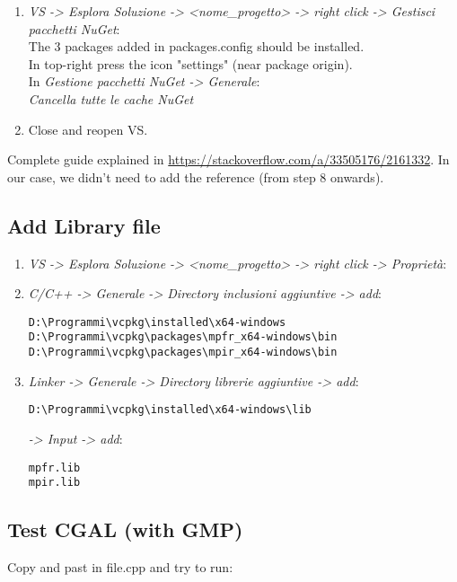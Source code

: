 \documentclass[10pt, english, openany]{report}
\begin{document}
\begin{appendices}
\begin{enumerate}
\item \textit{VS -> Esplora Soluzione -> <nome\_progetto> -> right click -> Gestisci pacchetti NuGet}: \\
The 3 packages added in packages.config should be installed.\\
In top-right press the icon "settings" (near package origin). \\
In \textit{Gestione pacchetti NuGet -> Generale}: \\

	\textit{Cancella tutte le cache NuGet}

\item Close and reopen VS.
\end{enumerate}

Complete guide explained in \href{https://stackoverflow.com/a/33505176/2161332}{https://stackoverflow.com/a/33505176/2161332}. In our case, we didn't need to add the reference (from step 8 onwards).


\subsection{Add Library file}
\begin{enumerate}
\item \textit{VS -> Esplora Soluzione -> <nome\_progetto> -> right click -> Proprietà}:

\item \textit{C/C++ -> Generale -> Directory inclusioni aggiuntive -> add}:

\begin{lstlisting}
D:\Programmi\vcpkg\installed\x64-windows
D:\Programmi\vcpkg\packages\mpfr_x64-windows\bin
D:\Programmi\vcpkg\packages\mpir_x64-windows\bin
\end{lstlisting}
	
\item \textit{Linker -> Generale -> Directory librerie aggiuntive -> add}:

\begin{lstlisting}
D:\Programmi\vcpkg\installed\x64-windows\lib
\end{lstlisting}

	 \textit{-> Input -> add}:
\begin{lstlisting}
mpfr.lib
mpir.lib	
\end{lstlisting}
\end{enumerate}
	
\subsection{Test CGAL (with GMP)}
Copy and past in file.cpp and try to run:


\end{appendices}
\end{document}

